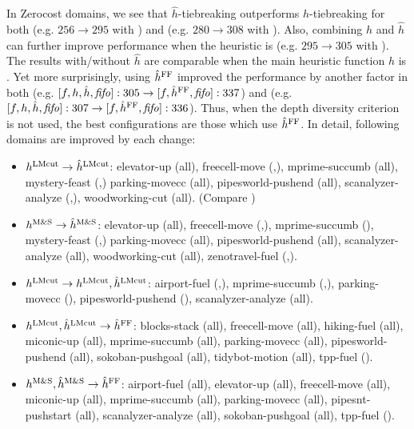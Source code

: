 In Zerocost domains, we see that $\hat{h}$-tiebreaking outperforms $h$-tiebreaking for both \lmcut (e.g. $256\rightarrow 295$ with \fifo) and \mands (e.g. $280\rightarrow 308$ with \fifo).
Also, combining $h$ and $\hat{h}$ can further improve performance when the heuristic is \lmcut (e.g. $295\rightarrow 305$ with \fifo). The results with/without $\hat{h}$ are comparable when the main heuristic function $h$ is \mands.
% 
Yet more surprisingly, using $\hat{h}^{\text{FF}}$ improved the performance by another factor in both \lmcut
(e.g. $[f,h,\hat{h},{\text{\textit{fifo}}}]:305 \rightarrow [f,\hat{h}^{\text{FF}},{\text{\textit{fifo}}}]:337$) and \mands 
(e.g. $[f,h,\hat{h},{\text{\textit{fifo}}}]:307 \rightarrow [f,\hat{h}^{\text{FF}},{\text{\textit{fifo}}}]:336$).
% 
Thus, when the depth diversity criterion  is not used, the best configurations are those
which use $\hat{h}^{\text{FF}}$.
In detail, following domains are improved by each change:
\begin{itemize}
 \item \textbf{$h^\text{LMcut} \to \hat{h}^\text{LMcut}$}: elevator-up (all), freecell-move (\fifo,\ro), mprime-succumb (all), mystery-feast (\lifo,\ro) parking-movecc (all), pipesworld-pushend (all), scanalyzer-analyze (\lifo,\ro), wood\-working-cut (all). (Compare )
 \item \textbf{$h^\text{M\&S} \to \hat{h}^\text{M\&S}$}: elevator-up (all), freecell-move (\fifo,\ro), mprime-succumb (\ro), mystery-feast (\fifo,\lifo) parking-movecc (all), pipesworld-pushend (all), scanalyzer-analyze (all), wood\-working-cut (all), zenotravel-fuel (\lifo,\ro).
 \item \textbf{$h^\text{LMcut} \to h^\text{LMcut},\hat{h}^\text{LMcut}$}: airport-fuel (\fifo,\ro), mprime-succumb (\fifo,\ro), parking-movecc (\lifo), pipesworld-pushend (\fifo), scanalyzer-analyze (all).
 \item \textbf{$h^\text{LMcut},\hat{h}^\text{LMcut} \to \hat{h}^{\text{FF}}$}: blocks-stack (all), freecell-move (all), hiking-fuel (all), miconic-up (all), mprime-succumb (all), parking-movecc (all), pipesworld-pushend (all), sokoban-pushgoal (all), tidybot-motion (all), tpp-fuel (\ro).
 \item \textbf{$h^\text{M\&S},\hat{h}^\text{M\&S} \to \hat{h}^{\text{FF}}$}: airport-fuel (all), elevator-up (all), freecell-move (all), miconic-up (all), mprime-succumb (all), parking-movecc (all), pipesnt-pushstart (all), scanalyzer-analyze (all), sokoban-pushgoal (all), tpp-fuel (\ro).
\end{itemize}
 
